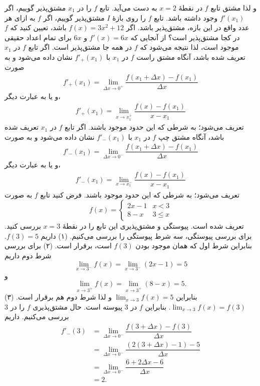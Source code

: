 و لذا مشتق تابع $f$ در نقطهٔ $x=2$ به دست می‌آید.
تابع $f$ را در $x_1$ مشتق‌پذیر گوییم، اگر $f'(x_1)$ وجود داشته باشد.
تابع $f$ را روی بازهٔ $I$ مشتق‌پذیر گوییم، اگر $f$ به ازای هر عدد واقع در این بازه، مشتق‌پذیر باشد.
اگر $f(x)=3x^2+12$ باشد، تعیین کنید که $f$ در کجا مشتق‌پذیر است؟
از آنجایی که $f'(x)=6x$  و $6x$ برای تمام اعداد حقیقی موجود است، لذا نتیجه
می‌شود که $f$ در همه جا مشتق‌پذیر است.
اگر تابع $f$ در $x_1$ تعریف شده باشد، آنگاه مشتق راست $f$ در $x_1$ با $f'_{+}(x_1)$ نشان داده
می‌شود و به صورت 
\begin{align}
f'_{+}(x_1)=\lim_{\Delta x\rightarrow 0^{+}}\dfrac{f(x_1+\Delta x) - f(x_1)}{\Delta x}
\end{align}
و یا به عبارت دیگر،
\begin{align}
f'_{+}(x_1)=\lim_{ x\rightarrow x_1^{+}}\dfrac{f(x) - f(x_1)}{x-x_1}
\end{align}
تعریف می‌شود؛ به شرطی که این حدود موجود باشند.
اگر تابع $f$ در $x_1$ تعریف شده باشد، آنگاه مشتق چپ $f$ در $x_1$ با $f'_{-}(x_1)$ نشان داده
می‌شود و به صورت 
\begin{align}
f'_{-}(x_1)=\lim_{\Delta x\rightarrow 0^{-}}\dfrac{f(x_1+\Delta x) - f(x_1)}{\Delta x}
\end{align}
و یا به عبارت دیگر،
\begin{align}
f'_{-}(x_1)=\lim_{ x\rightarrow x_1^{-}}\dfrac{f(x) - f(x_1)}{x-x_1}
\end{align}
تعریف می‌شود؛ به شرطی که این حدود موجود باشند.
فرض کنید تابع $f$ به صورت 
\[
f(x)=\left\{\begin{array}{ll}
2x-1& x<3\\
8-x & 3\leq x
\end{array} \right.
\]
تعریف شده است. پیوستگی و مشتق‌پذیری این تابع را در نقطهٔ $x=3$ بررسی کنید.
برای بررسی پیوستگی، سه شرط پیوستگی را بررسی می‌کنیم. (۱) داریم $f(3)=5$. بنابراین شرط اول که همان
موجود بودن $f(3)$ است، برقرار است. (۲) برای بررسی شرط دوم داریم
\[
\lim _{x\rightarrow 3^{-}}f(x)=\lim_{x\rightarrow 3^{-}} (2x-1)=5
\]
و 
\[
\lim _{x\rightarrow 3^{+}}f(x)=\lim_{x\rightarrow 3^{+}} (8-x)=5.
\]
بنابراین
 $\lim_{x\rightarrow 3}f(x)=5$
و لذا شرط دوم هم برقرار است. (۳)
$\lim_{x\rightarrow 3}f(x)=f(3)$.
بنابراین $f$ در $3$ پیوسته است. حال مشتق‌پذیری $f$ را در $3$ بررسی می‌کنیم. داریم
\begin{align*}
f'_{-}(3)&=\lim_{\Delta x\rightarrow 0^{-}}\dfrac{f(3+\Delta x)-f(3)}{\Delta x}\\
&=\lim_{\Delta x\rightarrow 0^{-}}\dfrac{(2(3+\Delta x)-1)-5}{\Delta x}\\
&=\lim_{\Delta x\rightarrow 0^{-}}\dfrac{6+2\Delta x-6}{\Delta x}\\
&=2.
\end{align*}

